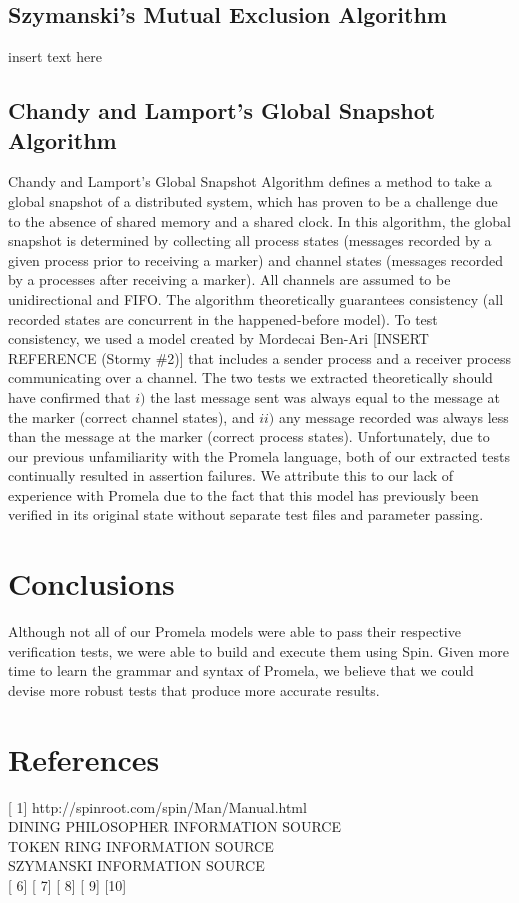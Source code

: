 \documentclass[12pt]{article}
\begin{document}
\begin{flushleft}
\subsection{Szymanski's Mutual Exclusion Algorithm}
insert text here

\subsection{Chandy and Lamport's Global Snapshot Algorithm}
Chandy and Lamport's Global Snapshot Algorithm defines a method to take a global snapshot of a distributed system, which has proven to be a challenge due to the absence of shared memory and a shared clock. In this algorithm, the global snapshot is determined by collecting all process states (messages recorded by a given process prior to receiving a marker) and channel states (messages recorded by a processes after receiving a marker). All channels are assumed to be unidirectional and FIFO. The algorithm theoretically guarantees consistency (all recorded states are concurrent in the happened-before model). To test consistency, we used a model created by Mordecai Ben-Ari [INSERT REFERENCE (Stormy \#2)] that includes a sender process and a receiver process communicating over a channel. The two tests we extracted theoretically should have confirmed that $i)$ the last message sent was always equal to the message at the marker (correct channel states), and $ii)$ any message recorded was always less than the message at the marker (correct process states). Unfortunately, due to our previous unfamiliarity with the Promela language, both of our extracted tests continually resulted in assertion failures. We attribute this to our lack of experience with Promela due to the fact that this model has previously been verified in its original state without separate test files and parameter passing.

\section{Conclusions}
Although not all of our Promela models were able to pass their respective verification tests, we were able to build and execute them using Spin. Given more time to learn the grammar and syntax of Promela, we believe that we could devise more robust tests that produce more accurate results.

\section{References}
[ 1] http://spinroot.com/spin/Man/Manual.html\\
[ 2] DINING PHILOSOPHER INFORMATION SOURCE\\
[ 3] TOKEN RING INFORMATION SOURCE\\
[ 4] SZYMANSKI INFORMATION SOURCE\\
[ 5]
[ 6]
[ 7]
[ 8]
[ 9]
[10]
\end{flushleft}
\end{document}
